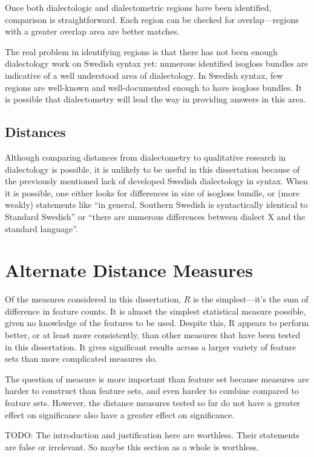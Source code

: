 Once both dialectologic and dialectometric regions have been
identified, comparison is straightforward. Each region can be checked
for overlap---regions with a greater overlap area are better matches.

The real problem in identifying regions is that there has not been
enough dialectology work on Swedish syntax yet: numerous identified
isogloss bundles are indicative of a well understood area of
dialectology. In Swedish syntax, few regions are well-known and
well-documented enough to have isogloss bundles. It is possible that
dialectometry will lead the way in providing answers in this
area.

\subsection{Distances}

Although comparing distances from dialectometry to qualitative
research in dialectology is possible, it is unlikely to be useful in
this dissertation because of the previously mentioned lack of
developed Swedish dialectology in syntax. When it is possible,
one either looks for differences in size of isogloss bundle, or (more
weakly) statements like ``in general, Southern
Swedish is syntactically identical to Standard Swedish''
\cite{rosenkvist07} or ``there are numerous differences between
dialect X and the standard language''.

\section{Alternate Distance Measures}

Of the measures considered in this dissertation, $R$ is the
simplest---it's the sum of difference in feature counts. It is almost
the simplest statistical measure possible, given no knowledge of the
features to be used. Despite this, R appears to perform better, or
at least more consistently, than other measures that have been tested
in this dissertation. It gives significant results across a larger
variety of feature sets than more complicated measures do.

The question of measure is more important than feature set because
measures are harder to construct than feature sets, and even harder to
combine compared to feature sets. However, the distance measures
tested so far do not have a greater effect on significance also have a
greater effect on significance.

TODO: The introduction and justification here are worthless. Their
statements are false or irrelevant. So maybe this section as a whole
is worthless.

